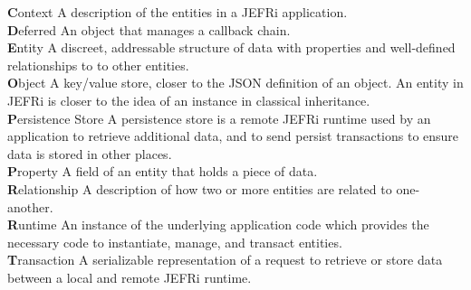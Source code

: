 \documentclass{article}
\renewcommand{\glossary}[2]{{\large \textbf #1} #2 \\ }
\begin{document}
\glossary{Context}{A description of the entities in a JEFRi application.}

\glossary{Deferred}{An object that manages a callback chain.}

\glossary{Entity}{A discreet, addressable structure of data with properties and
well-defined relationships to to other entities.}

\glossary{Object}{A key/value store, closer to the JSON definition of an object.
An entity in JEFRi is closer to the idea of an instance in classical
inheritance.}

\glossary{Persistence Store}{A persistence store is a remote JEFRi runtime used
by an application to retrieve additional data, and to send persist transactions
to ensure data is stored in other places.}

\glossary{Property}{A field of an entity that holds a piece of data.}

\glossary{Relationship}{A description of how two or more entities are related to
one-another.}

\glossary{Runtime}{An instance of the underlying application code which provides
the necessary code to instantiate, manage, and transact entities.}

\glossary{Transaction}{A serializable representation of a request to retrieve or
store data between a local and remote JEFRi runtime.}
\end{document}
